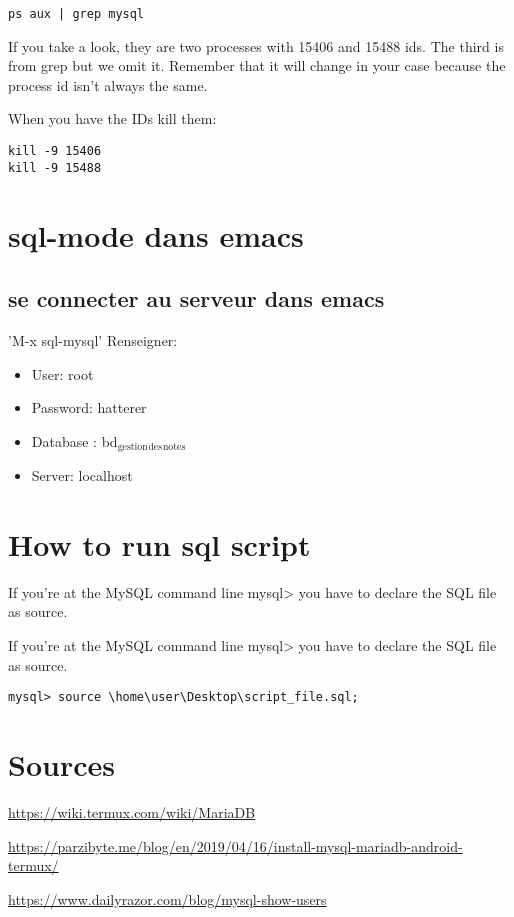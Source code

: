 \documentclass[11pt]{article}
\begin{document}
\begin{verbatim}
ps aux | grep mysql
\end{verbatim}

If you take a  look, they are two processes with 15406 and 15488 ids. The third is from grep but we omit it. Remember that it will change in your case because the process id isn’t always the same.

When you have the IDs kill them:
\begin{verbatim}
kill -9 15406
kill -9 15488
\end{verbatim}

\section{sql-mode dans emacs}
\label{sec:orgde6b02b}
\subsection{se connecter au serveur dans emacs}
\label{sec:org7f2cc78}
'M-x sql-mysql'
Renseigner:
\begin{itemize}
\item User: root
\item Password: hatterer
\item Database : bd\(_{\text{gestion}}\)\(_{\text{des}}\)\(_{\text{notes}}\)
\item Server: localhost
\end{itemize}

\section{How to run sql script}
\label{sec:org40a240e}
If you’re at the MySQL command line mysql> you have to declare the SQL file as source.

If you’re at the MySQL command line mysql> you have to declare the SQL file as source.


\begin{verbatim}
mysql> source \home\user\Desktop\script_file.sql;
\end{verbatim}


\section{Sources}
\label{sec:orgaf77403}

\url{https://wiki.termux.com/wiki/MariaDB}

\url{https://parzibyte.me/blog/en/2019/04/16/install-mysql-mariadb-android-termux/}

\url{https://www.dailyrazor.com/blog/mysql-show-users}
\end{document}
